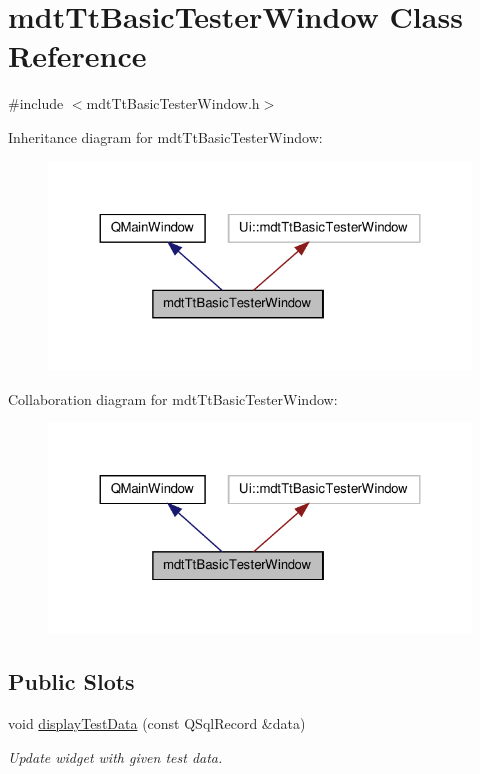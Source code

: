 \hypertarget{classmdt_tt_basic_tester_window}{\section{mdt\-Tt\-Basic\-Tester\-Window Class Reference}
\label{classmdt_tt_basic_tester_window}
}


{\ttfamily \#include $<$mdt\-Tt\-Basic\-Tester\-Window.\-h$>$}



Inheritance diagram for mdt\-Tt\-Basic\-Tester\-Window\-:\nopagebreak
\begin{figure}[H]
\begin{center}
\leavevmode
\includegraphics[width=324pt]{classmdt_tt_basic_tester_window__inherit__graph}
\end{center}
\end{figure}


Collaboration diagram for mdt\-Tt\-Basic\-Tester\-Window\-:\nopagebreak
\begin{figure}[H]
\begin{center}
\leavevmode
\includegraphics[width=324pt]{classmdt_tt_basic_tester_window__coll__graph}
\end{center}
\end{figure}
\subsection*{Public Slots}
\begin{DoxyCompactItemize}
\item 
void \hyperlink{classmdt_tt_basic_tester_window_afaf6162daad8565f2bbcb9adf71b80b1}{display\-Test\-Data} (const Q\-Sql\-Record \&data)
\begin{DoxyCompactList}\small\item\em Update widget with given test data. \end{DoxyCompactList}\end{DoxyCompactItemize}
